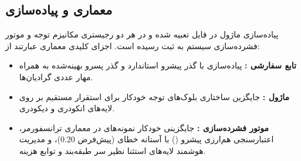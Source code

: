 \subsection{معماری و پیاده‌سازی}
پیاده‌سازی ماژول در فایل  تعبیه شده و در هر دو رجیستری مکانیزم توجه و موتور فشرده‌سازی سیستم به ثبت رسیده است. اجزای کلیدی معماری عبارتند از:
\begin{itemize}
    \item \textbf{تابع سفارشی :} پیاده‌سازی  با گذر پیشرو استاندارد و گذر پسرو بهینه‌شده به همراه مهار عددی گرادیان‌ها.
    \item \textbf{ماژول :} جایگزین ساختاری بلوک‌های توجه خودکار برای استقرار مستقیم بر روی لایه‌های انکودری و دیکودری.
    \item \textbf{موتور فشرده‌سازی :} جایگزینی خودکار نمونه‌های  در معماری ترانسفورمر، اعتبارسنجی هم‌ارزی پیشرو () با آستانه خطای  (پیش‌فرض $0.20$)، و مدیریت هوشمند لایه‌های استثنا نظیر سر طبقه‌بند و توابع هزینه.
\end{itemize}
